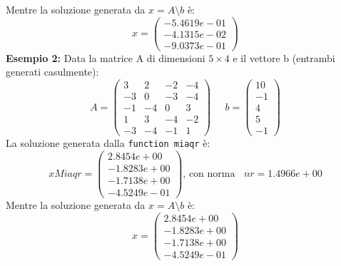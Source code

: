\documentclass[12pt]{article}
\begin{document}
Mentre la soluzione generata da \(x=A\setminus b\) è:
\begin{equation*} x=
    \begin{pmatrix}
        -5.4619e-01\\
        -4.1315e-02\\
        -9.0373e-01
    \end{pmatrix}
\end{equation*}
\textbf{Esempio 2:}
Data la matrice A di dimensioni \(5 \times 4\) e il vettore b (entrambi generati casulmente):
\begin{equation}A=
    \begin{pmatrix}
        3 & 2 & -2 & -4 \\
        -3 & 0 & -3 & -4 \\
        -1 & -4 & 0 & 3 \\
        1 & 3 & -4 & -2 \\
        -3 & -4 & -1 & 1 
    \end{pmatrix}\;\;\;\;\;
    b=
    \begin{pmatrix}
        10\\
        -1\\
        4\\
        5 \\
        -1
    \end{pmatrix}
\end{equation}
La soluzione generata dalla \texttt{function miaqr} è:
\begin{equation*}xMiaqr=
    \begin{pmatrix}
        2.8454e+00\\
        -1.8283e+00\\
        -1.7138e+00\\
        -4.5249e-01
    \end{pmatrix}\text{, con norma }\;\; nr = 1.4966e+00
\end{equation*}
Mentre la soluzione generata da \(x=A\setminus b\) è:
\begin{equation*} x=
    \begin{pmatrix}
        2.8454e+00\\
        -1.8283e+00\\
        -1.7138e+00\\
        -4.5249e-01
    \end{pmatrix}
\end{equation*}
\end{document}
